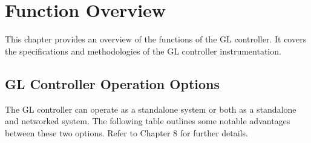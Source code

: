 \documentclass[11pt,twoside]{book}
\begin{document}
{{{{{{{\hypertarget{function-overview}{%
\chapter{Function Overview}

This chapter provides an overview of the functions of the GL controller.
It covers the specifications and methodologies of the GL controller
instrumentation.

\hypertarget{gl-controller-operation-options}{%
\section{GL Controller Operation
Options}

The GL controller can operate as a standalone system or both as a
standalone and networked system. The following table outlines some
notable advantages between these two options. Refer to Chapter 8 for
further details.

}}}}}}}}}
\end{document}
